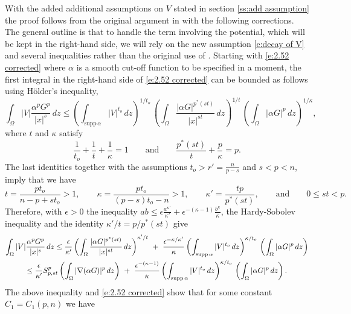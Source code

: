 \documentclass[10pt]{amsart}
\begin{document}
With the added additional assumptions on $V$ stated in section \ref{ss:add assumption} the proof  follows from the original argument in  \cite[Theorem 2.9]{V11} with the following corrections. The general outline is that to handle  the term involving the potential, which will be kept in the right-hand side, we will rely on the new assumption \eqref{e:decay of V} and several inequalities rather than the original use of \cite[(2.54)]{V11}. Starting with \eqref{e:2.52 corrected} where $\alpha$ is a smooth cut-off function to be specified in a moment,  the  first integral in the right-hand side of \eqref{e:2.52 corrected} can be bounded as follows using H\"older's inequality,
\begin{equation}
\int_{\Omega} |V|\frac
{\alpha^pG^p}{|x|^s}\,dz \leq \left (\int_{\mathrm{supp}\, \alpha} |V|^{t_o}\,dz\right)^{1/{t_o}}\,\left( \int_\Omega \frac {|\alpha G|^{p^*( st)}}{|x|^{st}} \, dz\right)^{1/t}\, \left( \int_\Omega   {|\alpha G|^{p}}\,dz\right)^{1/\kappa},
\end{equation}
where $t$ and $\kappa$ satisfy
\[
\frac {1}{t_o}+\frac {1}{t}+\frac {1}{\kappa}=1 \qquad \text{and}\qquad  \frac { {p^*(st)}}{t}+\frac {p}{\kappa}=p.
\]
The last identities together with the assumptions $t_o>r'=\frac {n}{p-s}$ and  $s<p<n$, imply that we have
\begin{equation}\label{e:exp in holder}
t=\frac {pt_o}{n-p+st_o}>1,\qquad \kappa=\frac{pt_o}{(p-s)t_o-n}>1, \qquad \kappa'=\frac {tp}{p^*(st)}, \qquad \text{and}\qquad 0\leq st<p.
\end{equation}
Therefore, with $\epsilon>0$ the inequality $ab\leq \epsilon \frac
{a^{\kappa'}}{\kappa'}+\epsilon^{-(\kappa-1)}\frac {b^{\kappa}}{\kappa}$, the Hardy-Sobolev inequality and the identity  $\kappa'/t=p/p^*(st)$ give
\begin{multline}\notag
\int_{\Omega} |V|\frac
{\alpha^pG^p}{|x|^s}\,dz \leq \frac {\epsilon}{\kappa'}\left( \int_\Omega \frac {|\alpha G|^{p^*( st)}}{|x|^{st}} \, dz\right)^{\kappa'/t}\ +\  \frac {\epsilon^{-\kappa/\kappa'}}{\kappa}\left (\int_{\mathrm{supp}\, \alpha} |V|^{t_o}\,dz\right)^{\kappa/{t_o}}\,\left( \int_\Omega  {|\alpha G|^{p}}\,dz\right)\\
\leq \frac {\epsilon}{\kappa'}S^{p}_{p,st}\left( \int_\Omega |\nabla(\alpha G)|^{p} \, dz\right)\ +\  \frac {\epsilon^{-(\kappa-1)}}{\kappa}\left (\int_{\mathrm{supp}\, \alpha} |V|^{t_o}\,dz\right)^{\kappa/{t_o}}\,\left( \int_\Omega  {|\alpha G|^{p}}\,dz\right).
\end{multline}
The above inequality and  \eqref{e:2.52 corrected} show that for some constant $C_1=C_1(p,n)$ we have
\end{document}
